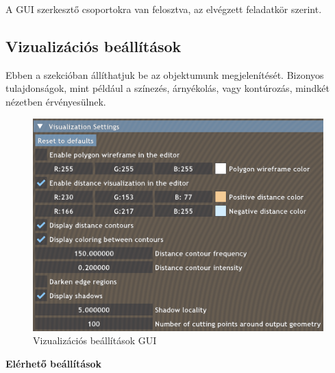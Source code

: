 A GUI szerkesztő csoportokra van felosztva, az elvégzett feladatkör szerint.


\subsection{Vizualizációs beállítások}

Ebben a szekcióban állíthatjuk be az objektumunk megjelenítését. Bizonyos tulajdonságok, mint például a színezés, árnyékolás, vagy kontúrozás, mindkét nézetben érvényesülnek.

\begin{figure}[H]
    \centering
    \includegraphics[width=0.8\linewidth]{images/visualization_settings.png}
    \caption{Vizualizációs beállítások GUI}
    \label{fig:visualization_settings-1}
\end{figure}

\textbf{Elérhető beállítások}

